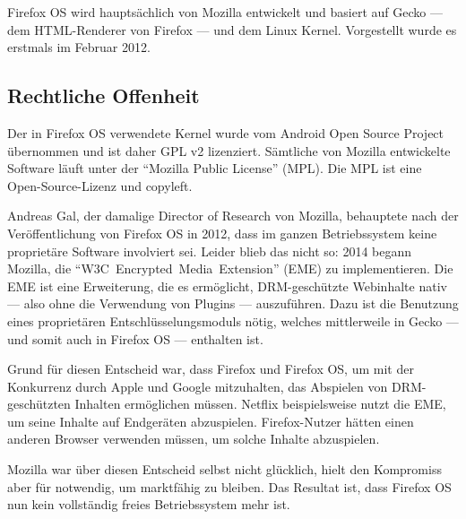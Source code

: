 Firefox OS wird hauptsächlich von Mozilla entwickelt und basiert auf Gecko --- dem HTML-Renderer von Firefox --- und dem Linux Kernel\thinspace\cite{online:ff-architecture}. Vorgestellt wurde es erstmals im Februar 2012\thinspace\cite{online:ff-techhive-b2g}.
\newline

\subsection{Rechtliche Offenheit}
Der in Firefox OS verwendete Kernel wurde vom Android Open Source Project übernommen und ist daher GPL v2 lizenziert\thinspace\cite{online:kernel-license}. Sämtliche von Mozilla entwickelte Software läuft unter der ``\mbox{Mozilla} Public License'' (MPL)\thinspace\cite{online:mozilla-licensing}. Die MPL ist eine \mbox{Open-Source-Lizenz} und copyleft\thinspace\cite{online:mpl}.

Andreas Gal, der damalige Director of Research von Mozilla, behauptete nach der Veröffentlichung von Firefox OS in 2012, dass im ganzen Betriebssystem keine proprietäre Software involviert sei\thinspace\cite{online:knowyourmobile-b2g}. Leider blieb das nicht so: 2014 begann Mozilla, die ``\mbox{W3C Encrypted Media Extension}'' (EME) zu implementieren\thinspace\cite{online:mozilla-eme}. Die EME  ist eine Erweiterung, die es ermöglicht, \mbox{DRM-geschützte} Webinhalte nativ --- also ohne die Verwendung von Plugins --- auszuführen. Dazu ist die Benutzung eines proprietären Entschlüsselungsmoduls nötig\thinspace\cite{online:mozilla-eme}, welches mittlerweile in Gecko --- und somit auch in Firefox OS --- enthalten ist.

Grund für diesen Entscheid war, dass Firefox und Firefox OS, um mit der Konkurrenz durch Apple und Google mitzuhalten, das Abspielen von \mbox{DRM-geschützten} Inhalten ermöglichen müssen. Netflix beispielsweise nutzt die EME, um seine Inhalte auf Endgeräten abzuspielen. Firefox-Nutzer hätten einen anderen Browser verwenden müssen, um solche Inhalte abzuspielen\thinspace\cite{online:mozilla-eme}.

Mozilla war über diesen Entscheid selbst nicht glücklich\thinspace\cite{online:ff-drm-implementation}, hielt den Kompromiss aber für notwendig, um marktfähig zu bleiben. Das Resultat ist, dass Firefox OS nun kein vollständig freies Betriebssystem mehr ist. 
\newline

